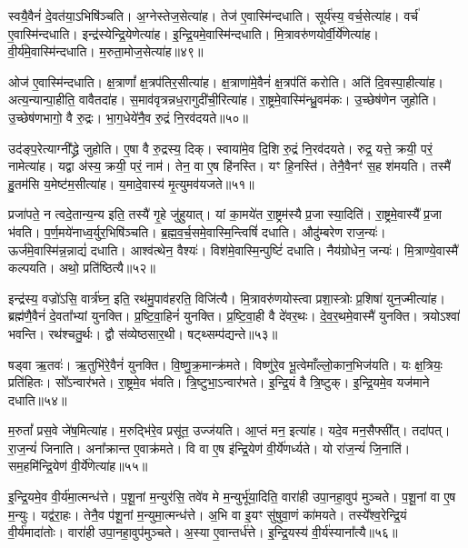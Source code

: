 स्वयै॒वैनं॑ दे॒वत॑या॒\-ऽभिषि॑ञ्चति।
अ॒ग्नेस्तेज॒सेत्या॑ह।
तेज॑ ए॒वास्मि॑न्दधाति।
सूर्य॑स्य॒ वर्च॒सेत्या॑ह।
वर्च॑ ए॒वास्मि॑न्दधाति।
इन्द्र॑स्येन्द्रि॒येणेत्या॑ह।
इ॒न्द्रि॒यमे॒वास्मि॑न्दधाति।
मि॒त्रावरु॑ण\-योर्वी॒र्ये॑णेत्या॑ह।
वी॒र्य॑मे॒वास्मि॑न्दधाति।
म॒रुता॒मोज॒सेत्या॑ह॥४९॥\ip

ओज॑ ए॒वास्मि॑न्दधाति।
क्ष॒त्राणां᳚ क्ष॒त्रप॑तिर॒सीत्या॑ह।
क्ष॒त्राणा॑मे॒वैनं॑ क्ष॒त्रप॑तिं करोति।
अति॑ दि॒वस्पा॒हीत्या॑ह।
अत्य॒न्यान्पा॒हीति॒ वावैतदा॑ह।
स॒माव॑वृत्रन्नध॒रागुदी॑ची॒\-रित्या॑ह।
रा॒ष्ट्रमे॒वास्मि॑न्ध्रु॒वम॑कः।
उ॒च्छेष॑णेन जुहोति।
उ॒च्छेष॑णभागो॒ वै रु॒द्रः।
भा॒ग॒धेये॑नै॒व रु॒द्रं नि॒रव॑दयते॥५०॥\ip

उद॑ङ्प॒रेत्याग्नी᳚द्ध्रे जुहोति।
ए॒षा वै रु॒द्रस्य॒ दिक्।
स्वाया॑मे॒व दि॒शि रु॒द्रं नि॒रव॑दयते।
रुद्र॒ यत्ते॒ क्रयी॒ परं॒ नामेत्या॑ह।
यद्वा अ॑स्य॒ क्रयी॒ परं॒ नाम॑।
तेन॒ वा ए॒ष हि॑नस्ति।
यꣳ हि॒नस्ति॑।
तेनै॒वैनꣳ॑ स॒ह श॑मयति।
तस्मै॑ हु॒तम॑सि य॒मेष्ट॑म॒सीत्या॑ह।
य॒मादे॒वास्य॑ मृ॒त्युमव॑यजते॥५१॥\ip

प्रजा॑पते॒ न त्वदे॒तान्य॒न्य इति॒ तस्यै॑ गृ॒हे जु॑हुयात्।
यां का॒मये॑त रा॒ष्ट्रम॑स्यै प्र॒जा स्या॒दिति॑।
रा॒ष्ट्रमे॒वास्यै᳚ प्र॒जा भ॑वति।
प॒र्ण॒मये॑नाध्व॒र्युर॒भिषि॑ञ्चति।
ब्र॒ह्म॒व॒र्च॒समे॒वा\-स्मि॒न्त्विषिं॑ दधाति।
औदु॑म्बरेण राज॒न्यः॑।
ऊर्ज॑मे॒वा\-स्मि॑न्न॒न्नाद्यं॑ दधाति।
आश्व॑त्थेन॒ वैश्यः॑।
विश॑मे॒वास्मि॒न्पुष्टिं॑ दधाति।
नैय॑ग्रोधेन॒ जन्यः॑।
मि॒त्राण्ये॒वास्मै॑ कल्पयति।
अथो॒ प्रति॑\-ष्ठित्यै॥५२॥\ip{}

इन्द्र॑स्य॒ वज्रो॑ऽसि॒ वार्त्र॑घ्न॒ इति॒ रथ॑मु॒पाव॑\-हरति॒ विजि॑त्यै।
मि॒त्रावरु॑णयोस्त्वा प्रशा॒स्त्रोः प्र॒शिषा॑ युन॒ज्मीत्या॑ह।
ब्रह्म॑णै॒वैनं॑ दे॒वता᳚भ्यां युनक्ति।
प्र॒ष्टि॒वा॒हिनं॑ युनक्ति।
प्र॒ष्टि॒वा॒ही वै दे॑वर॒थः।
दे॒व॒र॒थमे॒वास्मै॑ युनक्ति।
त्रयो\-ऽश्वा॑ भवन्ति।
रथ॑श्चतु॒र्थः।
द्वौ स॑व्येष्ठसार॒थी।
षट्थ्सम्प॑द्यन्ते॥५३॥\ip

षड्वा ऋ॒तवः॑।
ऋ॒तुभि॑रे॒वैनं॑ युनक्ति।
वि॒ष्णु॒क्र॒मान्क्र॑मते।
विष्णु॑रे॒व भू॒त्वेमाँल्लो॒कान॒भि\-ज॑यति।
यः क्ष॒त्रियः॒ प्रति॑\-हितः।
सो᳚ऽन्वार॑भते।
रा॒ष्ट्रमे॒व भ॑वति।
त्रि॒ष्टुभा॒\-ऽन्वार॑भते।
इ॒न्द्रि॒यं वै त्रि॒ष्टुक्।
इ॒न्द्रि॒यमे॒व यज॑माने दधाति॥५४॥\ip

म॒रुतां᳚ प्रस॒वे जे॑ष॒मित्या॑ह।
म॒रुद्भि॑रे॒व प्रसू॑त॒ उज्ज॑यति।
आ॒प्तं मन॒ इत्या॑ह।
यदे॒व मन॒सैफ्सी᳚त्।
तदा॑पत्।
रा॒ज॒न्यं॑ जिनाति।
अना᳚क्रान्त ए॒वाक्र॑मते।
वि वा ए॒ष इ॑न्द्रि॒येण॑ वी॒र्ये॑णर्ध्यते।
यो रा॑ज॒न्यं॑ जि॒नाति॑।
सम॒हमि॑न्द्रि॒येण॑ वी॒र्ये॑णेत्या॑ह॥५५॥\ip

इ॒न्द्रि॒यमे॒व वी॒र्य॑मा॒त्मन्ध॑त्ते।
प॒शू॒नां म॒न्युर॑सि॒ तवे॑व मे म॒न्युर्भू॑या॒दिति॒ वारा॑ही उपा॒नहा॒वुप॑ मुञ्चते।
प॒शू॒नां वा ए॒ष म॒न्युः।
यद्व॑रा॒हः।
तेनै॒व प॑शू॒नां म॒न्युमा॒त्मन्ध॑त्ते।
अ॒भि वा इ॒यꣳ सु॑षुवा॒णं का॑मयते।
तस्ये᳚श्व॒रेन्द्रि॒यं वी॒र्य॑मादा॑तोः।
वारा॑ही उपा॒नहा॒वुप॑मुञ्चते।
अ॒स्या ए॒वान्तर्ध॑त्ते।
इ॒न्द्रि॒यस्य॑ वी॒र्य॑स्याना᳚त्यै॥५६॥\ip

